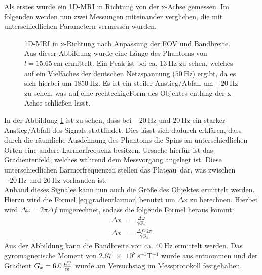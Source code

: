 Als erstes wurde ein 1D-MRI in Richtung von der x-Achse gemessen.
Im folgenden werden nun zwei Messungen miteinander verglichen, die mit unterschiedlichen Parametern vermessen wurden.  
\begin{figure}[H]
    \centering
    
    \caption[1D-MRI in x-Richtung nach Anpassung der FOV und Bandbreite]{1D-MRI in x-Richtung nach Anpassung der FOV und Bandbreite. Aus dieser Abbildung wurde eine Länge des Phantoms von $l=\SI{15,65}{\centi\m}$ ermittelt. Ein Peak ist bei ca. $\SI{13}{\hertz}$ zu sehen, welches auf ein Vielfaches der deutschen Netzspannung ($\SI{50}{\hertz}$) ergibt, da es sich hierbei um $\SI{1850}{\hertz}$. Es ist ein steiler Anstieg/Abfall um $\pm \SI{20}{\hertz}$ zu sehen, was auf eine \glqq rechteckige\grqq Form des Objektes entlang der x-Achse schließen lässt.\label{fig:1Dx}}
\end{figure}
In der Abbildung \ref{fig:1Dx} ist zu sehen, dass bei $\SI{-20}{\hertz}$ und $\SI{20}{\hertz}$ ein starker Anstieg/Abfall des Signals stattfindet. Dies lässt sich dadurch erklären, dass durch die räumliche Ausdehnung des Phantoms die Spins an unterschiedlichen Orten eine andere Larmorfrequenz besitzen. Ursache hierfür ist das Gradientenfeld, welches während dem Messvorgang angelegt ist. Diese unterschiedlichen Larmorfrequenzen stellen das \glqq Plateau\grqq \, dar, was zwischen $\SI{-20}{\hertz}$ und $\SI{20}{\hertz}$ vorhanden ist.\\
Anhand dieses Signales kann  nun auch die Größe des Objektes ermittelt werden. Hierzu wird die Formel \ref{eq:gradientlarmor} benutzt um $\Delta x$ zu berechnen. Hierbei wird $\Delta\omega= 2\pi \Delta f$ umgerechnet, sodass die folgende Formel heraus kommt:
\begin{align}
    \Delta x&=\frac{\Delta\omega}{\gamma G_x}\\
    \Delta x&=\frac{\Delta f \cdot 2\pi}{\gamma G_x}
\end{align}\label{eq:FOV}
Aus der Abbildung kann die Bandbreite von ca. $\SI{40}{\hertz}$ ermittelt werden. 
Das gyromagnetische Moment von $\SI{2.67e8}{\s^{-1}\tesla^{-1}}$ wurde aus \cite{Schmidt} entnommen und der Gradient $G_x=\SI{6,0}{\frac{\mu\tesla}{\m}}$ wurde am Versuchstag im Messprotokoll festgehalten.
